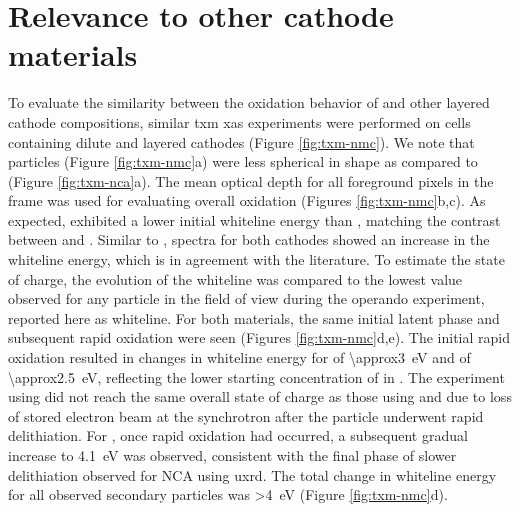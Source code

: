 \documentclass{article}
\begin{document}
\newpage %
\section{Relevance to other cathode materials}

To evaluate the similarity between the oxidation behavior of \nca{}
and other layered cathode compositions, similar \gls{txm} \gls{xas}
experiments were performed on cells containing dilute \nmc[333]{} and
\nmc[532]{} layered cathodes (Figure \ref{fig:txm-nmc}). We note that
\nmc{} particles (Figure \ref{fig:txm-nmc}a) were less spherical in
shape as compared to \nca{} (Figure \ref{fig:txm-nca}a). The mean
optical depth for all foreground pixels in the frame was used for
evaluating overall oxidation (Figures \ref{fig:txm-nmc}b,c). As
expected, \nmc[333]{} exhibited a lower initial whiteline energy than
\nca{}\cite{deb2005,muto2009}, matching the contrast between
 and . Similar to \nca{}, spectra for both
\nmc{} cathodes showed an increase in the whiteline energy, which is
in agreement with the literature\cite{deb2005}. To estimate the state
of charge, the evolution of the whiteline was compared to the lowest
value observed for any particle in the field of view during the
operando experiment, reported here as \textDelta{}whiteline. For both
\nmc{} materials, the same initial latent phase and subsequent rapid
oxidation were seen (Figures \ref{fig:txm-nmc}d,e). The initial rapid
 oxidation resulted in changes in whiteline energy for
\nmc[333]{} of \SI{\approx3}{\electronvolt} and \nmc[532]{} of
\SI{\approx2.5}{\electronvolt}, reflecting the lower starting
concentration of  in \nmc[333]{}. The experiment using
\nmc[532]{} did not reach the same overall state of charge as those
using \nmc[333]{} and \nca{} due to loss of stored electron beam at
the synchrotron after the particle underwent rapid delithiation. For
\nmc[333]{}, once rapid oxidation had occurred, a subsequent gradual
increase to \SI{4.1}{eV} was observed, consistent with the final phase
of slower delithiation observed for NCA using \gls{uxrd}. The total
change in whiteline energy for all observed secondary particles was
\SI{>4}{eV} (Figure \ref{fig:txm-nmc}d).
\end{document}
